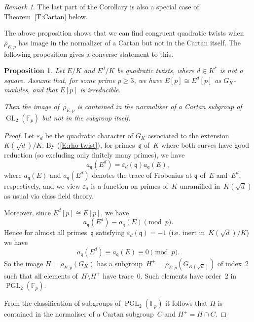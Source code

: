 \documentclass[12pt]{amsart}
\newcommand{\F}{\mathbb{F}}
\newcommand{\rhobar}{{\overline{\rho}}}
\newcommand{\frq}{{\mathfrak q}}
\newcommand{\eps}{\varepsilon}
\newcommand{\GL}{\operatorname{GL}}
\newcommand{\PGL}{\operatorname{PGL}}
\numberwithin{equation}{section}
\newtheorem{proposition}[theorem]{Proposition}
\theoremstyle{definition}
\theoremstyle{remark}
\newtheorem{remark}[theorem]{Remark}
\begin{document}
\begin{remark}\label{R:CM}
The last part of the Corollary is also a special case of
Theorem~\ref{T:Cartan} below.
\end{remark}


The above proposition shows that we can find congruent quadratic
twists when $\rhobar_{E,p}$ has image in the normalizer of a Cartan
but not in the Cartan itself. The following proposition gives a
converse statement to this.

\begin{proposition}\label{P:twist}
Let $E/K$ and $E^d/K$ be quadratic twists, where $d\in K^*$ is not a
square. Assume that, for some prime $p\ge3$, we have $E[p]\cong E^d[p]$
as $G_K$-modules, and that $E[p]$ is irreducible.

Then the image of~$\rhobar_{E,p}$
is contained in the normaliser of a Cartan subgroup of $\GL_2(\F_p)$
but not in the subgroup itself.
\end{proposition}

\begin{proof}
Let $\eps_d$ be the quadratic character of $G_K$ associated to the
extension $K(\sqrt{d})/K$. By (\ref{E:rho-twist}), for primes~$\frq$
of~$K$ where both curves have good reduction (so excluding only
finitely many primes), we have
\[
  a_\frq(E^d) = \eps_d(\frq) a_\frq(E),
\]
where $a_\frq(E)$ and $a_\frq(E^d)$ denotes the trace of Frobenius at
$\frq$ of~$E$ and~$E^d$, respectively, and we view $\eps_d$ is a
function on primes of~$K$ unramified in~$K(\sqrt{d})$ as usual via
class field theory.
  
Moreover, since $E^d[p]\cong
  E[p]$, we have
  \[
  a_\frq(E^d) \equiv a_\frq(E) \pmod{p}.
  \]
  Hence for almost all primes~$\frq$ satisfying $\eps_d(\frq) = -1$ (i.e. inert
  in~$K(\sqrt{d})/K$) we have
  \[
  a_\frq(E^d) \equiv a_\frq(E) \equiv0 \pmod{p}.
  \]
  So the image $H=\rhobar_{E,p}(G_K)$ has a
  subgroup~$H^+=\rhobar_{E,p}(G_{K(\sqrt{d})})$ of index~$2$ such that
  all elements of~$H\setminus H^+$ have trace~$0$.  Such elements have
  order~$2$ in $\PGL_2(\F_p)$.


  From the classification of subgroups
  of $\PGL_2(\F_p)$ it follows that $H$ is contained in the normaliser
  of a Cartan subgroup~$C$ and $H^+=H\cap C$.
\end{proof}
\end{document}
